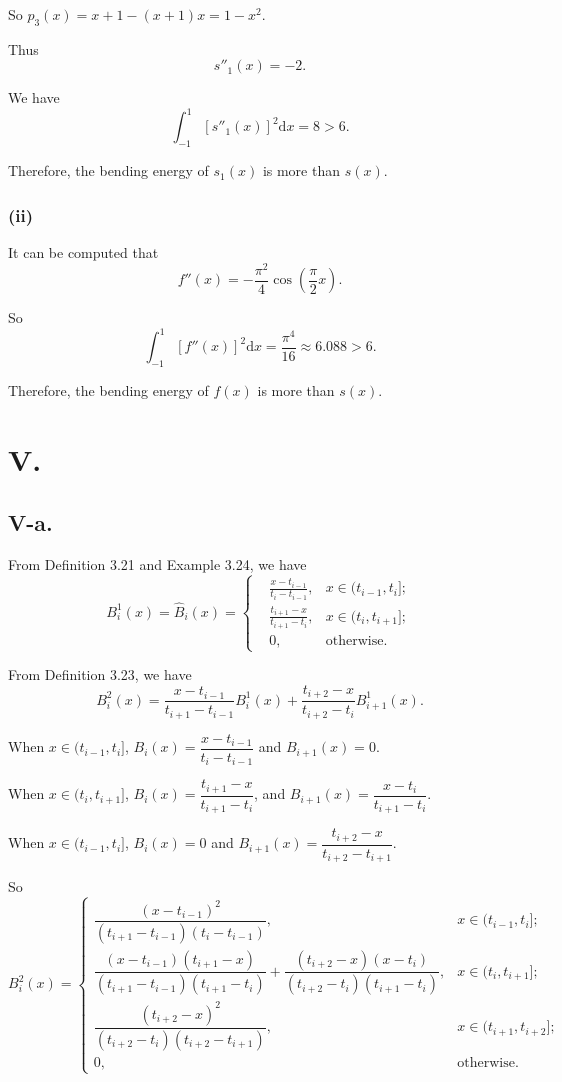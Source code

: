 \documentclass[a4paper]{article}
\begin{document}
So $p_3(x)=x+1-(x+1)x=1-x^2$.

Thus 
$$
s''_1(x)=-2.
$$

We have 
$$
\int_{-1}^{1}[s''_1(x)]^2 \mathrm{d}x=8>6.
$$

Therefore, the bending energy of $s_1(x)$ is more than $s(x)$.

\subsubsection*{(ii)}
It can be computed that $$f''(x)=-\frac{\pi^2}{4}\cos(\frac{\pi}{2}x).$$

So $$\int_{-1}^{1}[f''(x)]^2 \mathrm{d}x=\frac{\pi^4}{16}\approx6.088>6.$$

Therefore, the bending energy of $f(x)$ is more than $s(x)$.

\section*{V.}
\subsection*{V-a.}
From Definition 3.21 and Example 3.24, we have
$$
B^1_i(x)=\hat{B}_i(x)=
\left\{
\begin{aligned}
  &\frac{x-t_{i-1}}{t_i-t_{i-1}}, &x\in (t_{i-1},t_i];\\
  &\frac{t_{i+1}-x}{t_{i+1}-t_{i}}, &x\in (t_i,t_{i+1}]; \\
  &0, &\text{otherwise}.
\end{aligned}
\right.
$$

From Definition 3.23, we have 
$$B_i^{2}(x)=\frac{x-t_{i-1}}{t_{i+1}-t_{i-1}}B_i^1(x)+\frac{t_{i+2}-x}{t_{i+2}-t_i}B_{i+1}^1(x).$$

When $x\in(t_{i-1},t_i]$, $B_i(x)=\dfrac{x-t_{i-1}}{t_i-t_{i-1}}$ and $B_{i+1}(x)=0$.

When $x\in (t_i,t_{i+1}]$, $B_i(x)=\dfrac{t_{i+1}-x}{t_{i+1}-t_{i}}$, and $B_{i+1}(x)=\dfrac{x-t_{i}}{t_{i+1}-t_{i}}$.

When $x\in(t_{i-1},t_i]$, $B_i(x)=0$ and $B_{i+1}(x)=\dfrac{t_{i+2}-x}{t_{i+2}-t_{i+1}}$.

So 
$$
B_i^2(x)=\begin{cases}
  \dfrac{(x-t_{i-1})^2}{(t_{i+1}-t_{i-1})(t_i-t_{i-1})},&x\in(t_{i-1},t_i];\\
  \dfrac{(x-t_{i-1})(t_{i+1}-x)}{(t_{i+1}-t_{i-1})(t_{i+1}-t_i)}+\dfrac{(t_{i+2}-x)(x-t_i)}{(t_{i+2}-t_i)(t_{i+1}-t_i)},&x\in(t_i,t_{i+1}];\\
  \dfrac{(t_{i+2}-x)^2}{(t_{i+2}-t_i)(t_{i+2}-t_{i+1})},&x\in(t_{i+1},t_{i+2}];\\
  0,&\text{otherwise.}
\end{cases}
$$
\end{document}
